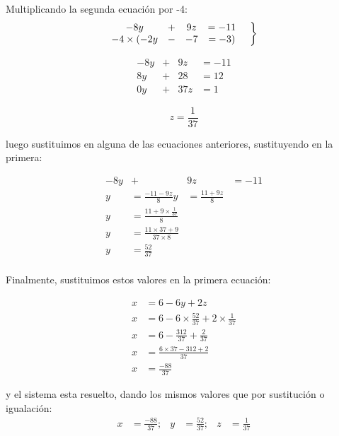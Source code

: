 \documentclass[12pt]{article}
\begin{document}
    Multiplicando la segunda ecuación por -4:
    \begin{equation*}
        \left.
        \begin{matrix}
           -8y &+&9z &= -11\\
            -4\times(-2y &-&-7 &= -3)
        \end{matrix}
        \hspace*{0.5cm}\right\rbrace
    \end{equation*}

    \begin{equation*}
        \begin{matrix}
           -8y &+&9z &= -11\\
            8y &+&28 &= 12\\
            \hline
            0y &+&37z &=1
        \end{matrix}
    \end{equation*}


    $$ z = \frac{1}{37}  $$

    luego sustituimos en alguna de las ecuaciones anteriores, sustituyendo en
    la primera:


    \begin{align*}
        -8y &+&9z &= -11\\
        y &= \frac{-11-9z}{8}
        y &= \frac{11+9z}{8} \\
        y &= \frac{11+9\times \frac{1}{37} }{8}\\
        y&= \frac{11\times37+9}{37\times8}  \\
        y&= \frac{52}{37} \\
    \end{align*}

    Finalmente, sustituimos estos valores en la primera ecuación:

    \begin{align*}
        x&= 6-6y+2z	\\
        x &= 6- 6\times \frac{52}{37} + 2\times \frac{1}{37}\\
        x&= 6- \frac{312}{37} + \frac{2}{37} \\
        x &= \frac{6\times37 - 312 + 2}{37}\\
        x &=\frac{-88}{37}
    \end{align*}

    y el sistema esta resuelto, dando los mismos valores que por sustitución o igualación:
    \begin{align*}
        x &=\frac{-88}{37} ;& y&=\frac{52}{37} ;& z&=\frac{1}{37}  		\\
    \end{align*}
\end{document}
